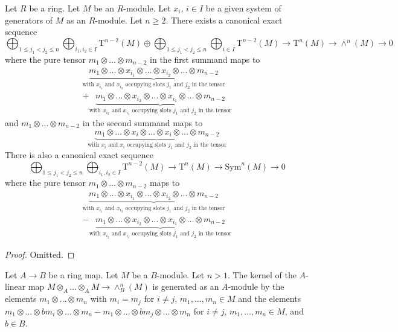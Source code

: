 \begin{lemma}
\label{lemma-present-sym-wedge}
Let $R$ be a ring.
Let $M$ be an $R$-module.
Let $x_i$, $i \in I$ be a given system of generators of
$M$ as an $R$-module. Let $n \geq 2$.
There exists a canonical exact sequence
$$
\bigoplus_{1 \leq j_1 < j_2 \leq n}
\bigoplus_{i_1, i_2 \in I}
\text{T}^{n - 2}(M)
\oplus
\bigoplus_{1 \leq j_1 < j_2 \leq n}
\bigoplus_{i \in I}
\text{T}^{n - 2}(M)
\to
\text{T}^n(M)
\to
\wedge^n(M)
\to
0
$$
where the pure tensor $m_1 \otimes \ldots \otimes m_{n - 2}$ in the first
summand maps to
\begin{align*}
\underbrace{
m_1 \otimes \ldots \otimes x_{i_1} \otimes \ldots
\otimes x_{i_2} \otimes \ldots \otimes m_{n - 2}
}_{\text{with } x_{i_1} \text{ and } x_{i_2}
\text{ occupying slots } j_1 \text{ and } j_2
\text{ in the tensor}} \\
+
\underbrace{
m_1 \otimes \ldots \otimes x_{i_2} \otimes \ldots
\otimes x_{i_1} \otimes \ldots \otimes m_{n - 2}
}_{\text{with } x_{i_2} \text{ and } x_{i_1}
\text{ occupying slots } j_1 \text{ and } j_2
\text{ in the tensor}}
\end{align*}
and $m_1 \otimes \ldots \otimes m_{n - 2}$ in the second
summand maps to
$$
\underbrace{
m_1 \otimes \ldots \otimes x_i \otimes \ldots
\otimes x_i \otimes \ldots \otimes m_{n - 2}
}_{\text{with } x_{i} \text{ and } x_{i}
\text{ occupying slots } j_1 \text{ and } j_2
\text{ in the tensor}}
$$
There is also a canonical exact sequence
$$
\bigoplus_{1 \leq j_1 < j_2 \leq n}
\bigoplus_{i_1, i_2 \in I}
\text{T}^{n - 2}(M)
\to
\text{T}^n(M)
\to
\text{Sym}^n(M)
\to
0
$$
where the pure tensor $m_1 \otimes \ldots \otimes m_{n - 2}$ maps to
\begin{align*}
\underbrace{
m_1 \otimes \ldots \otimes x_{i_1} \otimes \ldots
\otimes x_{i_2} \otimes \ldots \otimes m_{n - 2}
}_{\text{with } x_{i_1} \text{ and } x_{i_2}
\text{ occupying slots } j_1 \text{ and } j_2
\text{ in the tensor}} \\
-
\underbrace{
m_1 \otimes \ldots \otimes x_{i_2} \otimes \ldots
\otimes x_{i_1} \otimes \ldots \otimes m_{n - 2}
}_{\text{with } x_{i_2} \text{ and } x_{i_1}
\text{ occupying slots } j_1 \text{ and } j_2
\text{ in the tensor}}
\end{align*}
\end{lemma}

\begin{proof}
Omitted.
\end{proof}

\begin{lemma}
\label{lemma-present-wedge}
Let $A \to B$ be a ring map. Let $M$ be a $B$-module.
Let $n > 1$. The kernel of the $A$-linear map
$M \otimes_A \ldots \otimes_A M \to \wedge^n_B(M)$
is generated as an $A$-module by the elements
$m_1 \otimes \ldots \otimes m_n$ with $m_i = m_j$
for $i \not = j$, $m_1, \ldots, m_n \in M$ and the elements
$m_1 \otimes \ldots \otimes bm_i \otimes \ldots \otimes m_n -
m_1 \otimes \ldots \otimes bm_j \otimes \ldots \otimes m_n$
for $i \not = j$, $m_1, \ldots, m_n \in M$, and $b \in B$.
\end{lemma}

